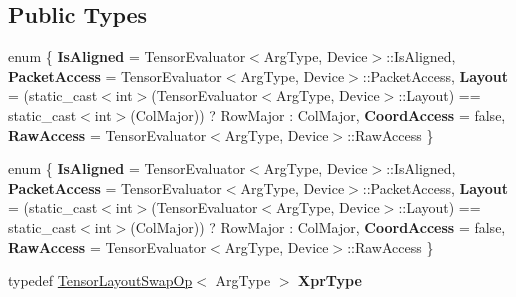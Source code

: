 \subsection*{Public Types}
\begin{DoxyCompactItemize}
\item 
\mbox{\label{struct_eigen_1_1_tensor_evaluator_3_01const_01_tensor_layout_swap_op_3_01_arg_type_01_4_00_01_device_01_4_a73788b1ad1f48633e26eb51cc1573c15}} 
enum \{ \newline
{\bfseries Is\+Aligned} = Tensor\+Evaluator$<$Arg\+Type, Device$>$\+:\+:Is\+Aligned, 
{\bfseries Packet\+Access} = Tensor\+Evaluator$<$Arg\+Type, Device$>$\+:\+:Packet\+Access, 
{\bfseries Layout} = (static\+\_\+cast$<$int$>$(Tensor\+Evaluator$<$Arg\+Type, Device$>$\+:\+:Layout) == static\+\_\+cast$<$int$>$(Col\+Major)) ? Row\+Major \+: Col\+Major, 
{\bfseries Coord\+Access} = false, 
\newline
{\bfseries Raw\+Access} = Tensor\+Evaluator$<$Arg\+Type, Device$>$\+:\+:Raw\+Access
 \}
\item 
\mbox{\label{struct_eigen_1_1_tensor_evaluator_3_01const_01_tensor_layout_swap_op_3_01_arg_type_01_4_00_01_device_01_4_aabd6781c086892d8d40c570457e6d955}} 
enum \{ \newline
{\bfseries Is\+Aligned} = Tensor\+Evaluator$<$Arg\+Type, Device$>$\+:\+:Is\+Aligned, 
{\bfseries Packet\+Access} = Tensor\+Evaluator$<$Arg\+Type, Device$>$\+:\+:Packet\+Access, 
{\bfseries Layout} = (static\+\_\+cast$<$int$>$(Tensor\+Evaluator$<$Arg\+Type, Device$>$\+:\+:Layout) == static\+\_\+cast$<$int$>$(Col\+Major)) ? Row\+Major \+: Col\+Major, 
{\bfseries Coord\+Access} = false, 
\newline
{\bfseries Raw\+Access} = Tensor\+Evaluator$<$Arg\+Type, Device$>$\+:\+:Raw\+Access
 \}
\item 
\mbox{\label{struct_eigen_1_1_tensor_evaluator_3_01const_01_tensor_layout_swap_op_3_01_arg_type_01_4_00_01_device_01_4_a859a95e77332770ae8cf43f151afe748}} 
typedef \hyperlink{class_eigen_1_1_tensor_layout_swap_op}{Tensor\+Layout\+Swap\+Op}$<$ Arg\+Type $>$ {\bfseries Xpr\+Type}

\end{DoxyCompactItemize}
